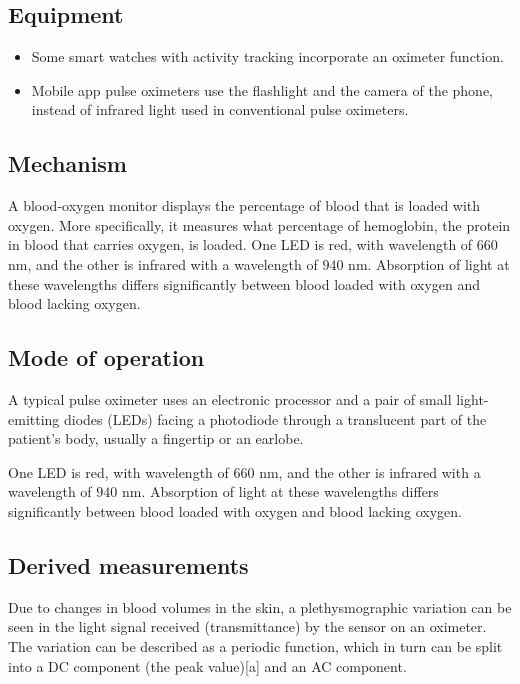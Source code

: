 \documentclass[12pt]{article}
\begin{document}
 \subsection{Equipment}
 \begin{itemize}
 \item Some smart watches with activity tracking incorporate an oximeter function.
\item Mobile app pulse oximeters use the flashlight and the camera of the phone, instead of infrared light used in conventional pulse oximeters.

\end{itemize}

\subsection{Mechanism}
A blood-oxygen monitor displays the percentage of blood that is loaded with oxygen. More specifically, it measures what percentage of hemoglobin, the protein in blood that carries oxygen, is loaded.\newline\newline
One LED is red, with wavelength of $660$ nm, and the other is infrared with a wavelength of $940$ nm. Absorption of light at these wavelengths differs significantly between blood loaded with oxygen and blood lacking oxygen.

\subsection{Mode of operation}
A typical pulse oximeter uses an electronic processor and a pair of small light-emitting diodes (LEDs) facing a photodiode through a translucent part of the patient's body, usually a fingertip or an earlobe. \newline

One LED is red, with wavelength of $660$ nm, and the other is infrared with a wavelength of $940$ nm. Absorption of light at these wavelengths differs significantly between blood loaded with oxygen and blood lacking oxygen.

 \subsection{Derived measurements}
 Due to changes in blood volumes in the skin, a plethysmographic variation can be seen in the light signal received (transmittance) by the sensor on an oximeter. The variation can be described as a periodic function, which in turn can be split into a DC component (the peak value)[a] and an AC component.
\newline\newline
\end{document}
